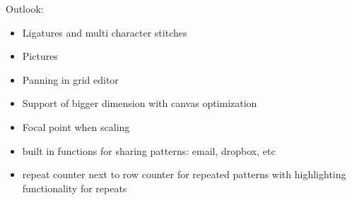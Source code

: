 Outlook:
\begin{itemize}
\item Ligatures and multi character stitches
\item Pictures
\item Panning in grid editor
\item Support of bigger dimension with canvas optimization
\item Focal point when scaling
\item built in functions for sharing patterns: email, dropbox, etc
\item repeat counter next to row counter for repeated patterns with highlighting functionality for repeats
\end{itemize}
